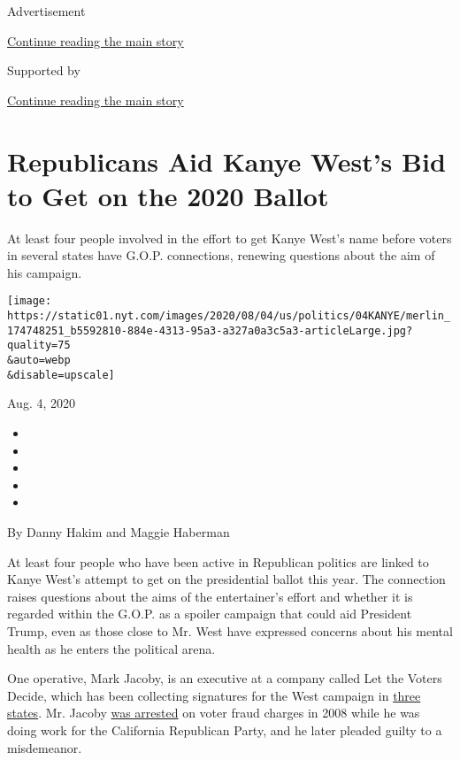 Advertisement

\protect\hyperlink{after-top}{Continue reading the main story}

Supported by

\protect\hyperlink{after-sponsor}{Continue reading the main story}

\hypertarget{republicans-aid-kanye-wests-bid-to-get-on-the-2020-ballot}{%
\section{Republicans Aid Kanye West's Bid to Get on the 2020
Ballot}\label{republicans-aid-kanye-wests-bid-to-get-on-the-2020-ballot}}

At least four people involved in the effort to get Kanye West's name
before voters in several states have G.O.P. connections, renewing
questions about the aim of his campaign.

\texttt{[image: https://static01.nyt.com/images/2020/08/04/us/politics/04KANYE/merlin\_174748251\_b5592810-884e-4313-95a3-a327a0a3c5a3-articleLarge.jpg?quality=75\\\&auto=webp\\\&disable=upscale]}

Aug. 4, 2020

\begin{itemize}
\item
\item
\item
\item
\item
\end{itemize}

By Danny Hakim and Maggie Haberman

At least four people who have been active in Republican politics are
linked to Kanye West's attempt to get on the presidential ballot this
year. The connection raises questions about the aims of the
entertainer's effort and whether it is regarded within the G.O.P. as a
spoiler campaign that could aid President Trump, even as those close to
Mr. West have expressed concerns about his mental health as he enters
the political arena.

One operative, Mark Jacoby, is an executive at a company called Let the
Voters Decide, which has been collecting signatures for the West
campaign in
\href{https://www.tmz.com/2020/08/02/kanye-makes-play-to-get-on-presidential-ballot-in-ohio/}{three
states}. Mr. Jacoby
\href{https://www.cbsnews.com/news/signature-gatherer-arrested-in-voter-fraud/}{was
arrested} on voter fraud charges in 2008 while he was doing work for the
California Republican Party, and he later pleaded guilty to a
misdemeanor.

